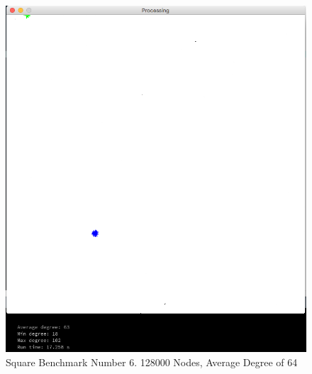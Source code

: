 \documentclass{article}
\begin{document}
\begin{center}
    \begin{figure}
        \includegraphics[scale=0.45]{./images/square_5.png}
        \caption{Square Benchmark Number 6. 128000 Nodes, Average Degree of 64}
        \label{square5}
    \end{figure}
\end{center}
\end{document}
